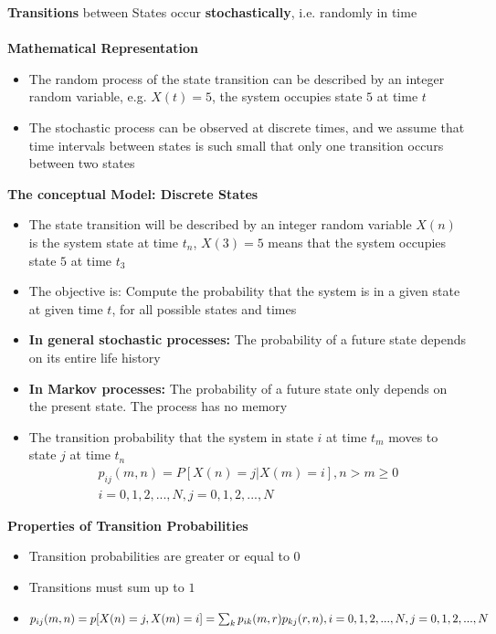 \documentclass[8pt, landscape, fleqn]{scrartcl}
\begin{document}
\begin{multicols*}{3}
\textbf{Transitions} between States occur \textbf{stochastically}, i.e. randomly in time \\ \\
\textbf{Mathematical Representation}

\begin{itemize}
    \item The random process of the state transition can be described by an integer random variable, e.g. $X(t) = 5$, the system occupies state $5$ at time $t$
    \item The stochastic process can be observed at discrete times, and we assume that time intervals between states is such small that only one transition occurs between two states
\end{itemize}

\textbf{The conceptual Model: Discrete States}

\begin{itemize}
    \item The state transition will be described by an integer random variable $X(n)$ is the system state at time $t_n$, $X(3) = 5$ means that the system occupies state $5$ at time $t_3$
    \item The objective is: Compute the probability that the system is in a given state at given time $t$, for all possible states and times
\end{itemize}

\begin{itemize}
    \item \textbf{In general stochastic processes:} The probability of a future state depends on its entire life history
    \item \textbf{In Markov processes:} The probability of a future state only depends on the present state. The process has no memory 
    \item The transition probability that the system in state $i$ at time $t_m$ moves to state $j$ at time $t_n$ \begin{align}
        p_{ij}(m,n) = P\left[X(n) = j | X(m) = i\right], n> m \geq 0 \\
        i = 0,1,2,...,N, j= 0,1,2,...,N
    \end{align}
\end{itemize}

\textbf{Properties of Transition Probabilities}

\begin{itemize}
    \item Transition probabilities are greater or equal to $0$
    \item Transitions must sum up to $1$
    \item $p_{ij}(m,n) = p[X(n)=j,X(m)=i] \\ = \sum_k p_{ik}(m,r)p_{kj}(r,n), \\ i=0,1,2,...,N, j=0,1,2,...,N$
\end{itemize}


\end{multicols*}
\end{document}

